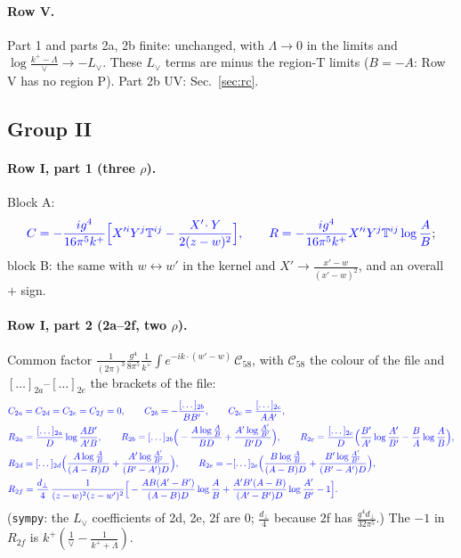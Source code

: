 \documentclass[10pt]{article}
\numberwithin{equation}{section}
\newcommand{\new}[1]{{\color{blue}#1}}
\newcommand{\Lv}{L_{\vee}}
\newcommand{\pre}{\frac{1}{(2\pi)^3}}
\newcommand{\phw}{e^{-ik\cdot(w'-w)}}
\begin{document}
\paragraph{Row V.} Part 1 and parts 2a, 2b finite: unchanged, with $\Lambda\to0$ in the limits and $\log\frac{k^+-\Lambda}{\vee}\to-\Lv$. These $\Lv$ terms are minus the region-T limits ($B=-A$: Row V has no region P). Part 2b UV: Sec.~\ref{sec:rc}.

\subsection{Group II}
\paragraph{Row I, part 1 (three $\rho$).} Block A:
\begin{equation*}
\new{C=-\frac{ig^4}{16\pi^5k^+}\Big[X'^iY^j\mathbb T^{ij}-\frac{X'\!\cdot Y}{2(z-w)^2}\Big],\qquad R=-\frac{ig^4}{16\pi^5k^+}X'^iY^j\mathbb T^{ij}\log\frac AB};
\end{equation*}
block B: the same with $w\leftrightarrow w'$ in the kernel and $X'\to\frac{x'-w}{(x'-w)^2}$, and an overall $+$ sign.
\paragraph{Row I, part 2 (2a--2f, two $\rho$).} Common factor $\pre\frac{g^4}{8\pi^5}\frac{1}{k^+}\int\phw\,\mathcal C_{58}$, with $\mathcal C_{58}$ the colour of the file and $[\dots]_{2a}$--$[\dots]_{2e}$ the brackets of the file:
\begin{align*}
&\new{C_{2a}=C_{2d}=C_{2e}=C_{2f}=0,\qquad C_{2b}=-\frac{[\dots]_{2b}}{BB'},\qquad C_{2c}=\frac{[\dots]_{2c}}{AA'},}\\
&\new{R_{2a}=\frac{[\dots]_{2a}}{D}\log\frac{AB'}{A'B},\qquad R_{2b}=[\dots]_{2b}\Big(-\frac{A\log\frac AB}{BD}+\frac{A'\log\frac{A'}{B'}}{B'D}\Big),\qquad R_{2c}=\frac{[\dots]_{2c}}{D}\Big(\frac{B'}{A'}\log\frac{A'}{B'}-\frac BA\log\frac AB\Big),}\\
&\new{R_{2d}=[\dots]_{2d}\Big(\frac{A\log\frac AB}{(A-B)D}+\frac{A'\log\frac{A'}{B'}}{(B'-A')D}\Big),\qquad R_{2e}=-[\dots]_{2e}\Big(\frac{B\log\frac AB}{(A-B)D}+\frac{B'\log\frac{A'}{B'}}{(B'-A')D}\Big),}\\
&\new{R_{2f}=\frac{d_\perp}{4}\,\frac{1}{(z-w)^2(z-w')^2}\Big[-\frac{AB(A'-B')}{(A-B)D}\log\frac AB+\frac{A'B'(A-B)}{(A'-B')D}\log\frac{A'}{B'}-1\Big].}
\end{align*}
(\texttt{sympy}: the $\Lv$ coefficients of 2d, 2e, 2f are $0$; $\frac{d_\perp}{4}$ because 2f has $\frac{g^4d_\perp}{32\pi^5}$.) The $-1$ in $R_{2f}$ is $k^+(\frac1\vee-\frac{1}{k^++\Lambda})$.
\end{document}
